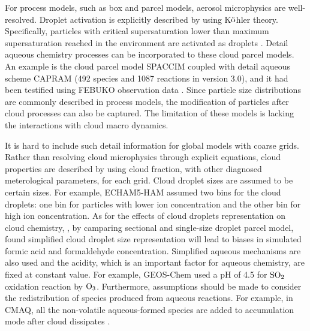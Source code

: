 \documentclass[edeposit,fullpage]{uiucthesis2009}
\begin{document}
For process models, such as box and parcel models, aerosol microphysics are well-resolved. Droplet activation is explicitly described by using K$\rm \ddot{o}$hler theory. Specifically, particles with critical supersaturation lower than maximum supersaturation reached in the environment are activated as droplets \citep{rothenberg2016metamodeling, ching2012impacts}. Detail aqueous chemistry processes can be incorporated to these cloud parcel models. An example is the cloud parcel model SPACCIM coupled with detail aqueous scheme CAPRAM (492 species and 1087 reactions in version 3.0), and it had been testified using FEBUKO observation data \citep{wolke2005spaccim}. Since particle size distributions are commonly described in process models, the modification of particles after cloud processes can also be captured. The limitation of these models is lacking the interactions with cloud macro dynamics.

It is hard to include such detail information for global models with coarse grids. Rather than resolving cloud microphysics through explicit equations, cloud properties are described by using cloud fraction, with other diagnosed meterological parameters, for each grid. Cloud droplet sizes are assumed to be certain sizes. For example, ECHAM5-HAM assumed two bins for the cloud droplets: one bin for particles with lower ion concentration and the other bin for high ion concentration. As for the effects of cloud droplets representation on cloud chemistry, \citet{barth2006importance}, by camparing sectional and single-size droplet parcel model, found simplified cloud droplet size representation will lead to biases in simulated formic acid and formaldehyde concentration. Simplified aqueous mechanisms are also used and the acidity, which is an important factor for aqueous chemistry, are fixed at constant value. For example, GEOS-Chem used a pH of 4.5 for $\rm SO_2$ oxidation reaction by $\rm O_3$\citep{park2004natural}. Furthermore, assumptions should be made to consider the redistribution of species produced from aqueous reactions. For example, in CMAQ, all the non-volatile aqueous-formed species are added to accumulation mode after cloud dissipates \citep{binkowski2003models, fahey2017framework}. 
 
\end{document}
